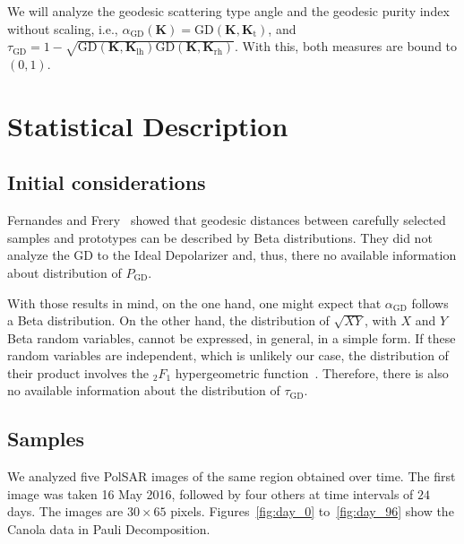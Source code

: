 \documentclass[journal]{IEEEtran}
\begin{document}
	We will analyze the geodesic scattering type angle and the geodesic purity index without scaling, i.e., $\alpha_{\text{GD}}(\bm{K}) = \text{GD}(\bm{K},\bm{K}_{\text{t}})$, and 
	$\tau_{\text{GD}} = 1 - \sqrt{\text{GD}(\bm{K},\bm{K}_{\text{lh}})\text{GD}(\bm{K},\bm{K}_{\text{rh}})}$.
	With this, both measures are bound to $(0,1)$.
	
	\section{Statistical Description}
	
	\subsection{Initial considerations}
	
	Fernandes and Frery~\cite{StatisticalPropertiesofGeodesicDistancesBetweenSamplesandElementaryScatterersinPolSARImagery2019} showed that geodesic distances between carefully selected samples and prototypes can be described by Beta distributions.
	They did not analyze the GD to the Ideal Depolarizer and, thus, there no available information about distribution of $P_{\text{GD}}$.
	
	With those results in mind, on the one hand, one might expect that $\alpha_{\text{GD}}$ follows a Beta distribution.
	On the other hand, the distribution of $\sqrt{XY}$, with $X$ and $Y$ Beta random variables, cannot be expressed, in general, in a simple form.
	If these random variables are independent, which is unlikely our case, the distribution of their product involves the ${}_2F_{1}$ hypergeometric function~\cite[Corollary~2.1]{OntheDistributionoftheProductofIndependentBetaRandomVariables}.
	Therefore, there is also no available information about the distribution of $\tau_{\text{GD}}$.
	
	
	\subsection{Samples}
	
	We analyzed five PolSAR images of the same region obtained over time. The first image was taken 16 May 2016, followed by four others at time intervals of $24$ days. The images are $30 \times 65$ pixels.
	Figures~\ref{fig:day_0} to~\ref{fig:day_96} show the Canola data in Pauli Decomposition. 
	
\end{document}
